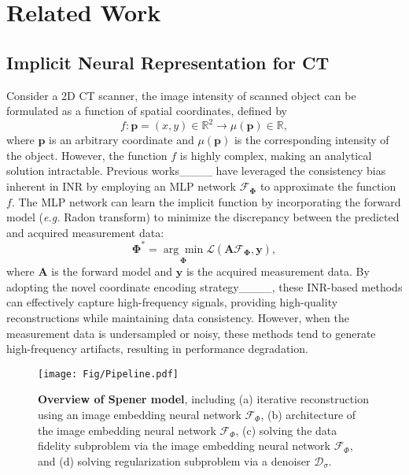 \section{Related Work}
\subsection{Implicit Neural Representation for CT}
Consider a 2D CT scanner, the image intensity of scanned object can be formulated as a function of spatial coordinates, defined by
\begin{equation}
    f: \mathbf{p} = (x,y) \in \mathbb{R}^2 \longrightarrow \mu(\mathbf{p}) \in \mathbb{R},
\label{eq:inr_ct}
\end{equation}
where $\mathbf{p}$ is an arbitrary coordinate and $\mu(\mathbf{p})$ is the corresponding intensity of the object. However, the function $f$ is highly complex, making an analytical solution intractable. Previous works____ have leveraged the consistency bias inherent in INR by employing an MLP network $\mathcal{F}_{\mathbf{\Phi}}$ to approximate the function $f$.
The MLP network can learn the implicit function by incorporating the forward model (\textit{e.g.} Radon transform) to minimize the discrepancy between the predicted and acquired measurement data:
\begin{equation}
    \mathbf{\Phi}^* = \underset{\mathbf{\Phi}}{\arg\min} \mathcal{L}(\mathbf{A}\mathcal{F}_\mathbf{\Phi}, \mathbf{y}),
\end{equation}
where $\mathbf{A}$ is the forward model and $\mathbf{y}$ is the acquired measurement data.
By adopting the novel coordinate encoding strategy____, these INR-based methods can effectively capture high-frequency signals, providing high-quality reconstructions while maintaining data consistency. However, when the measurement data is undersampled or noisy, these methods tend to generate high-frequency artifacts, resulting in performance degradation.
\begin{figure*}[!t]
\centering
\texttt{[image: Fig/Pipeline.pdf]} 
\caption{\textbf{Overview of Spener model}, including (a) iterative reconstruction using an image embedding neural network $\mathcal{F}_\Phi$, (b) architecture of the image embedding neural network $\mathcal{F}_\Phi$, (c) solving the data fidelity subproblem via the image embedding neural network $\mathcal{F}_\Phi$, and (d) solving regularization subproblem via a denoiser $\mathcal{D}_\sigma$.}
\label{fig:pipeline}
\end{figure*}

